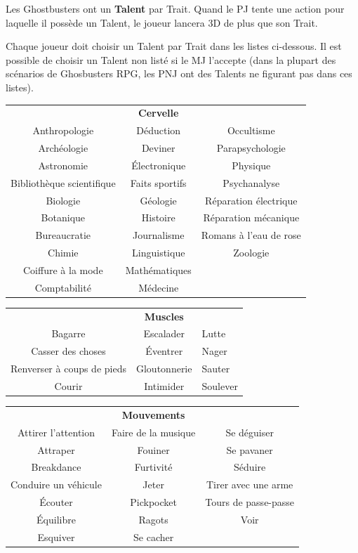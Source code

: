 \begin{frame}[b]
{

\myindent Les Ghostbusters ont un \textbf{Talent} par Trait. Quand le PJ tente une action pour laquelle il possède un Talent, le joueur lancera 3D de plus que son Trait.

\myindent Chaque joueur doit choisir un Talent par Trait dans les listes ci-dessous. Il est possible de choisir un Talent non listé si le MJ l'accepte (dans la plupart des scénarios de Ghosbusters RPG, les PNJ ont des Talents ne figurant pas dans ces listes).
}{
\begin{center}
\begin{tabular}{ccc}
&\textbf{Cervelle}&\\
Anthropologie & Déduction & Occultisme \\ 
Archéologie & Deviner & Parapsychologie \\
Astronomie & Électronique &  Physique \\ 
Bibliothèque scientifique & Faits sportifs & Psychanalyse \\ 
Biologie & Géologie & Réparation électrique \\
Botanique & Histoire & Réparation mécanique \\
Bureaucratie & Journalisme & Romans à l'eau de rose \\
Chimie & Linguistique & Zoologie \\
Coiffure à la mode & Mathématiques & \\
Comptabilité & Médecine & \\
\end{tabular}
\end{center}

\begin{center}
\begin{tabular}{cc>{\centering\arraybackslash}p{2.5cm}}
& \textbf{Muscles} &  \\
Bagarre & Escalader & Lutte \\
Casser des choses & Éventrer & Nager \\
Renverser à coups de pieds & Gloutonnerie & Sauter \\
Courir & Intimider & Soulever \\
\end{tabular}
\end{center}

\begin{center}
\begin{tabular}{ccc}
& \textbf{Mouvements} & \\
Attirer l'attention & Faire de la musique & Se déguiser \\
Attraper & Fouiner & Se pavaner \\
Breakdance & Furtivité & Séduire \\
Conduire un véhicule & Jeter & Tirer avec une arme \\
Écouter & Pickpocket & Tours de passe-passe \\
Équilibre & Ragots & Voir \\
Esquiver & Se cacher &  \\
\end{tabular}
\end{center}

}
\end{frame}
